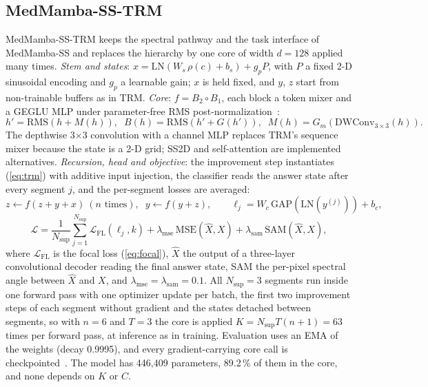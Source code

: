 \documentclass{svproc}
\begin{document}
\subsection{MedMamba-SS-TRM}\label{sec:sstrm}
MedMamba-SS-TRM keeps the spectral pathway and the task interface of MedMamba-SS and replaces the hierarchy by one core of width $d = 128$ applied many times. \emph{Stem and states}: $x = \mathrm{LN}(W_s\, \rho(c) + b_s) + g_p P$, with $P$ a fixed 2-D sinusoidal encoding and $g_p$ a learnable gain; $x$ is held fixed, and $y$, $z$ start from non-trainable buffers as in TRM. \emph{Core}: $f = B_2 \circ B_1$, each block a token mixer and a GEGLU MLP under parameter-free RMS post-normalization~\cite{rmsnorm}:
\begin{equation}
h' = \mathrm{RMS}(h + M(h)), \;\; B(h) = \mathrm{RMS}(h' + G(h')), \;\; M(h) = G_m(\mathrm{DWConv}_{3\times3}(h)).
\label{eq:core}
\end{equation}
The depthwise 3$\times$3 convolution with a channel MLP replaces TRM's sequence mixer because the state is a 2-D grid; SS2D and self-attention are implemented alternatives. \emph{Recursion, head and objective}: the improvement step instantiates (\ref{eq:trm}) with additive input injection, the classifier reads the answer state after every segment $j$, and the per-segment losses are averaged:
\begin{equation}
z \leftarrow f(z + y + x)\ (n \text{ times}), \;\; y \leftarrow f(y + z), \qquad \ell_j = W_c\, \mathrm{GAP}(\mathrm{LN}(y^{(j)})) + b_c,
\label{eq:recursion}
\end{equation}
\begin{equation}
\mathcal{L} = \frac{1}{N_{\text{sup}}} \sum_{j=1}^{N_{\text{sup}}} \mathcal{L}_{\text{FL}}(\ell_j, k) + \lambda_{\text{mse}}\, \mathrm{MSE}(\hat{X}, X) + \lambda_{\text{sam}}\, \mathrm{SAM}(\hat{X}, X),
\label{eq:loss}
\end{equation}
where $\mathcal{L}_{\text{FL}}$ is the focal loss (\ref{eq:focal}), $\hat{X}$ the output of a three-layer convolutional decoder reading the final answer state, SAM the per-pixel spectral angle between $\hat{X}$ and $X$, and $\lambda_{\text{mse}} = \lambda_{\text{sam}} = 0.1$. All $N_{\text{sup}} = 3$ segments run inside one forward pass with one optimizer update per batch, the first two improvement steps of each segment without gradient and the states detached between segments, so with $n = 6$ and $T = 3$ the core is applied $K = N_{\text{sup}} T (n+1) = 63$ times per forward pass, at inference as in training. Evaluation uses an EMA of the weights (decay 0.9995), and every gradient-carrying core call is checkpointed~\cite{checkpointing}. The model has 446,409 parameters, 89.2\,\% of them in the core, and none depends on $K$ or $C$.
\end{document}
